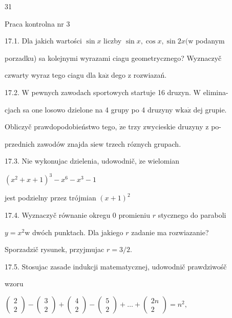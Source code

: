 \documentclass[a4paper,12pt]{article}
\begin{document}
31

Praca kontrolna nr 3

17.1. Dla jakich wartości $\sin x$ liczby $\sin x, \cos x, \sin 2x (\mathrm{w}$ podanym

porzadku) sa kolejnymi wyrazami ciagu geometrycznego? Wyznaczyč

czwarty wyraz tego ciagu dla $\mathrm{k}\mathrm{a}\dot{\mathrm{z}}$ dego $\mathrm{z}$ rozwiazań.

17.2. $\mathrm{W}$ pewnych zawodach sportowych startuje 16 druzyn. $\mathrm{W}$ elimina-

cjach sa one losowo dzielone na 4 grupy po 4 druzyny $\mathrm{w}\mathrm{k}\mathrm{a}\dot{\mathrm{z}}$ dej grupie.

Obliczyč prawdopodobieństwo tego, $\dot{\mathrm{z}}\mathrm{e}$ trzy zwycieskie druzyny $\mathrm{z}$ po-

przednich zawodów znajda $\mathrm{s}\mathrm{i}\mathrm{e}\mathrm{w}$ trzech róznych grupach.

17.3. Nie wykonujac dzielenia, udowodnič, $\dot{\mathrm{z}}\mathrm{e}$ wielomian

$(x^{2}+x+1)^{3}-x^{6}-x^{3}-1$

jest podzielny przez trójmian $(x+1)^{2}$

17.4. Wyznaczyč równanie okregu $0$ promieniu $r$ stycznego do paraboli

$y=x^{2}\mathrm{w}$ dwóch punktach. Dla jakiego $r$ zadanie ma rozwiazanie?

Sporzadzič rysunek, przyjmujac $r=3/2.$

17.5. Stosujac zasade indukcji matematycznej, udowodnič prawdziwośč

wzoru

$\left(\begin{array}{l}
2\\
2
\end{array}\right) - \left(\begin{array}{l}
3\\
2
\end{array}\right)+\left(\begin{array}{l}
4\\
2
\end{array}\right) - \left(\begin{array}{l}
5\\
2
\end{array}\right)+\ldots+\left(\begin{array}{l}
2n\\
2
\end{array}\right) =n^{2},$
\end{document}
